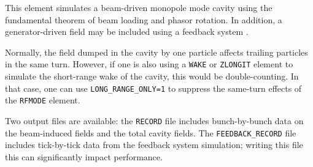 This element simulates a beam-driven monopole mode cavity using the fundamental theorem of beam loading and phasor rotation.
In addition, a generator-driven field may be included using a feedback system \cite{Berenc-IPAC15-MOPMA006}.

Normally, the field dumped in the cavity by one particle affects trailing particles in the same turn.
However, if one is also using a \verb|WAKE| or \verb|ZLONGIT| element to simulate the short-range wake of the cavity, this would be double-counting.
In that case, one can use \verb|LONG_RANGE_ONLY=1| to suppress the same-turn effects of the \verb|RFMODE| element.

Two output files are available: the \verb|RECORD| file includes bunch-by-bunch data on the beam-induced fields and the total cavity fields.
The \verb|FEEDBACK_RECORD| file includes tick-by-tick data from the feedback system simulation; writing this file this can significantly impact performance.

